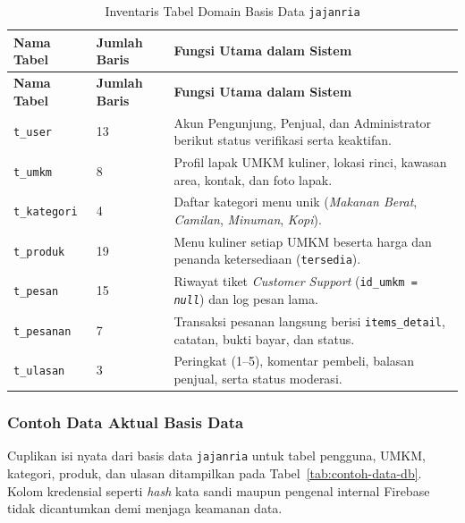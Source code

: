 \renewcommand{\arraystretch}{1.22}
\begin{longtable}{|L{2.8cm}|C{2.0cm}|L{\dimexpr\textwidth-2.8cm-2.0cm-6\arrayrulewidth\relax}|}
\caption{Inventaris Tabel Domain Basis Data \texttt{jajanria}}
\label{tab:inventaris-db} \\
\hline
{}
\textbf{Nama Tabel} & \textbf{Jumlah Baris} & \textbf{Fungsi Utama dalam Sistem} \\
\hline
\endfirsthead
\hline
{}
\textbf{Nama Tabel} & \textbf{Jumlah Baris} & \textbf{Fungsi Utama dalam Sistem} \\
\hline
\endhead
\hline
\endfoot
\texttt{t\_user} & 13 & Akun Pengunjung, Penjual, dan Administrator berikut status verifikasi serta keaktifan. \\
\hline
\texttt{t\_umkm} & 8 & Profil lapak UMKM kuliner, lokasi rinci, kawasan area, kontak, dan foto lapak. \\
\hline
\texttt{t\_kategori} & 4 & Daftar kategori menu unik (\textit{Makanan Berat}, \textit{Camilan}, \textit{Minuman}, \textit{Kopi}). \\
\hline
\texttt{t\_produk} & 19 & Menu kuliner setiap UMKM beserta harga dan penanda ketersediaan (\texttt{tersedia}). \\
\hline
\texttt{t\_pesan} & 15 & Riwayat tiket \textit{Customer Support} (\texttt{id\_umkm = \textit{null}}) dan log pesan lama. \\
\hline
\texttt{t\_pesanan} & 7 & Transaksi pesanan langsung berisi \texttt{items\_detail}, catatan, bukti bayar, dan status. \\
\hline
\texttt{t\_ulasan} & 3 & Peringkat (1--5), komentar pembeli, balasan penjual, serta status moderasi. \\
\hline
\end{longtable}

\subsubsection{Contoh Data Aktual Basis Data}
Cuplikan isi nyata dari basis data \texttt{jajanria} untuk tabel pengguna, UMKM, kategori, produk, dan ulasan ditampilkan pada Tabel~\ref{tab:contoh-data-db}. Kolom kredensial seperti \textit{hash} kata sandi maupun pengenal internal Firebase tidak dicantumkan demi menjaga keamanan data.

